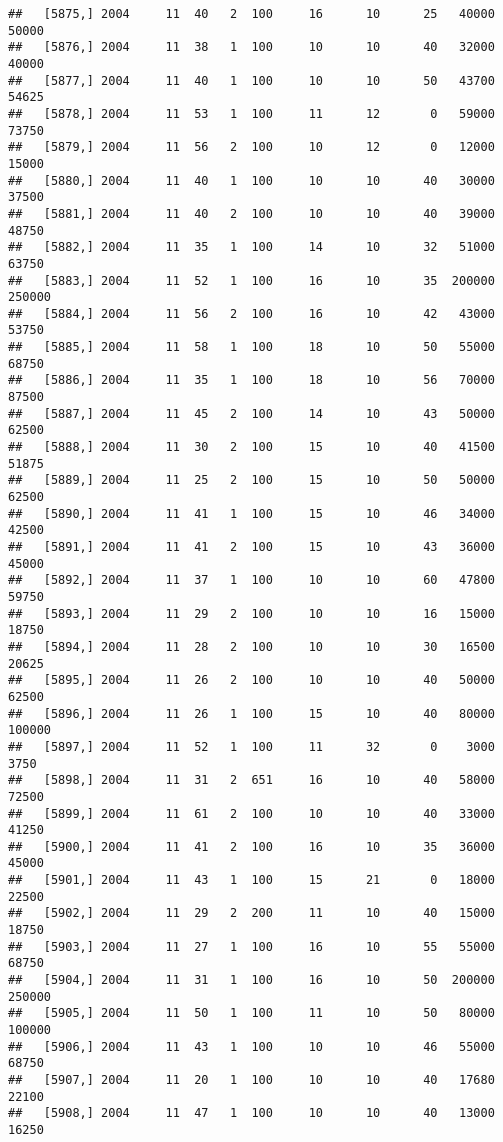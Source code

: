 \documentclass{article}\usepackage[]{graphicx}\usepackage[]{color}
\makeatletter
\newenvironment{kframe}{%
 \def\at@end@of@kframe{}%
 \ifinner\ifhmode%
  \def\at@end@of@kframe{\end{minipage}}%
  \begin{minipage}{\columnwidth}%
 \fi\fi%
 \def\FrameCommand##1{\hskip\@totalleftmargin \hskip-\fboxsep
 \colorbox{shadecolor}{##1}\hskip-\fboxsep
     \hskip-\linewidth \hskip-\@totalleftmargin \hskip\columnwidth}%
 \MakeFramed {\advance\hsize-\width
   \@totalleftmargin\z@ \linewidth\hsize
   \@setminipage}}%
 {\par\unskip\endMakeFramed%
 \at@end@of@kframe}
\newenvironment{knitrout}{}{} %
\makeatother
\begin{document}
\begin{knitrout}
\begin{kframe}
\begin{verbatim}
##   [5875,] 2004     11  40   2  100     16      10      25   40000   50000
##   [5876,] 2004     11  38   1  100     10      10      40   32000   40000
##   [5877,] 2004     11  40   1  100     10      10      50   43700   54625
##   [5878,] 2004     11  53   1  100     11      12       0   59000   73750
##   [5879,] 2004     11  56   2  100     10      12       0   12000   15000
##   [5880,] 2004     11  40   1  100     10      10      40   30000   37500
##   [5881,] 2004     11  40   2  100     10      10      40   39000   48750
##   [5882,] 2004     11  35   1  100     14      10      32   51000   63750
##   [5883,] 2004     11  52   1  100     16      10      35  200000  250000
##   [5884,] 2004     11  56   2  100     16      10      42   43000   53750
##   [5885,] 2004     11  58   1  100     18      10      50   55000   68750
##   [5886,] 2004     11  35   1  100     18      10      56   70000   87500
##   [5887,] 2004     11  45   2  100     14      10      43   50000   62500
##   [5888,] 2004     11  30   2  100     15      10      40   41500   51875
##   [5889,] 2004     11  25   2  100     15      10      50   50000   62500
##   [5890,] 2004     11  41   1  100     15      10      46   34000   42500
##   [5891,] 2004     11  41   2  100     15      10      43   36000   45000
##   [5892,] 2004     11  37   1  100     10      10      60   47800   59750
##   [5893,] 2004     11  29   2  100     10      10      16   15000   18750
##   [5894,] 2004     11  28   2  100     10      10      30   16500   20625
##   [5895,] 2004     11  26   2  100     10      10      40   50000   62500
##   [5896,] 2004     11  26   1  100     15      10      40   80000  100000
##   [5897,] 2004     11  52   1  100     11      32       0    3000    3750
##   [5898,] 2004     11  31   2  651     16      10      40   58000   72500
##   [5899,] 2004     11  61   2  100     10      10      40   33000   41250
##   [5900,] 2004     11  41   2  100     16      10      35   36000   45000
##   [5901,] 2004     11  43   1  100     15      21       0   18000   22500
##   [5902,] 2004     11  29   2  200     11      10      40   15000   18750
##   [5903,] 2004     11  27   1  100     16      10      55   55000   68750
##   [5904,] 2004     11  31   1  100     16      10      50  200000  250000
##   [5905,] 2004     11  50   1  100     11      10      50   80000  100000
##   [5906,] 2004     11  43   1  100     10      10      46   55000   68750
##   [5907,] 2004     11  20   1  100     10      10      40   17680   22100
##   [5908,] 2004     11  47   1  100     10      10      40   13000   16250

\end{verbatim}
\end{kframe}
\end{knitrout}
\end{document}
